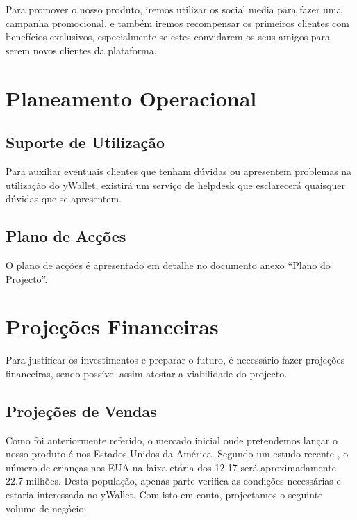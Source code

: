 \documentclass[12pt,a4paper]{article}
\begin{document}
Para promover o nosso produto, iremos utilizar os social media para fazer uma campanha promocional, e também iremos recompensar os primeiros clientes com benefícios exclusivos, especialmente se estes convidarem os seus amigos para serem novos clientes da plataforma.


\newpage
\section{Planeamento Operacional}
\label{sec:planeamento_operacional}


\subsection{Suporte de Utilização}
\label{subsec:suporte_de_utilizacao}

Para auxiliar eventuais clientes que tenham dúvidas ou apresentem problemas na utilização do yWallet, existirá um serviço de helpdesk que esclarecerá quaisquer dúvidas que se apresentem.


\subsection{Plano de Acções}
\label{subsec:plano_de_accoes}

O plano de acções é apresentado em detalhe no documento anexo “Plano do Projecto”.

\newpage
\section{Projeções Financeiras}
\label{sec:projecoes_financeiras}

Para justificar os investimentos e preparar o futuro, é necessário fazer projeções financeiras, sendo possível assim atestar a viabilidade do projecto.

\subsection{Projeções de Vendas}
\label{subsec:projecoes_de_vendas}

Como foi anteriormente referido, o mercado inicial onde pretendemos lançar o nosso produto é nos Estados Unidos da América. Segundo um estudo recente \cite{POP1}, o número de crianças nos EUA na faixa etária dos 12-17 será aproximadamente 22.7 milhões. 
Desta população, apenas parte verifica as condições necessárias e estaria interessada no yWallet. Com isto em conta, projectamos o seguinte volume de negócio:
\end{document}
